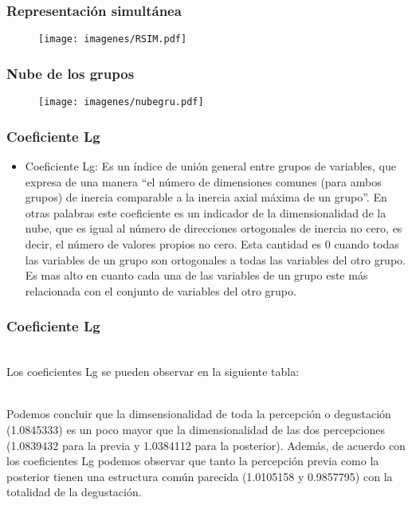 \documentclass[12pt]{beamer}
\begin{document}
\begin{frame}
\frametitle{Representación simultánea}
\begin{figure}[h]
  \centering
  \texttt{[image: imagenes/RSIM.pdf]}
\end{figure}
\end{frame}

\begin{frame}
\frametitle{Nube de los grupos}
\begin{figure}[h]
  \centering
  \texttt{[image: imagenes/nubegru.pdf]}
\end{figure}
\end{frame}

\begin{frame}
\frametitle{Coeficiente Lg}
\begin{itemize}
\item Coeficiente Lg: Es un índice de unión general entre grupos de variables, que expresa de una manera ``el número de dimensiones comunes (para ambos grupos) de inercia comparable a la inercia axial máxima de un grupo''. En otras palabras este coeficiente es un indicador de la dimensionalidad de la nube, que es igual al número de direcciones ortogonales de inercia no cero, es decir, el número de valores propios no cero. Esta cantidad es 0 cuando todas las variables de un grupo son ortogonales a todas las variables del otro grupo. Es mas alto en cuanto cada una de las variables de un grupo este más relacionada con el conjunto de variables del otro grupo.
\end{itemize}
\end{frame}

\begin{frame}
\frametitle{Coeficiente Lg}
~\\Los coeficientes Lg se pueden observar en la siguiente tabla:
\begin{center}
\end{center}
~\\Podemos concluir que la dimsensionalidad de toda la percepción o degustación (1.0845333) es un poco mayor que la dimensionalidad de las dos percepciones (1.0839432 para la previa y 1.0384112 para la posterior). Además, de acuerdo con los coeficientes Lg podemos observar que tanto la percepción previa como la posterior tienen una estructura común parecida (1.0105158 y 0.9857795) con la totalidad de la degustación.
\end{frame}
\end{document}
